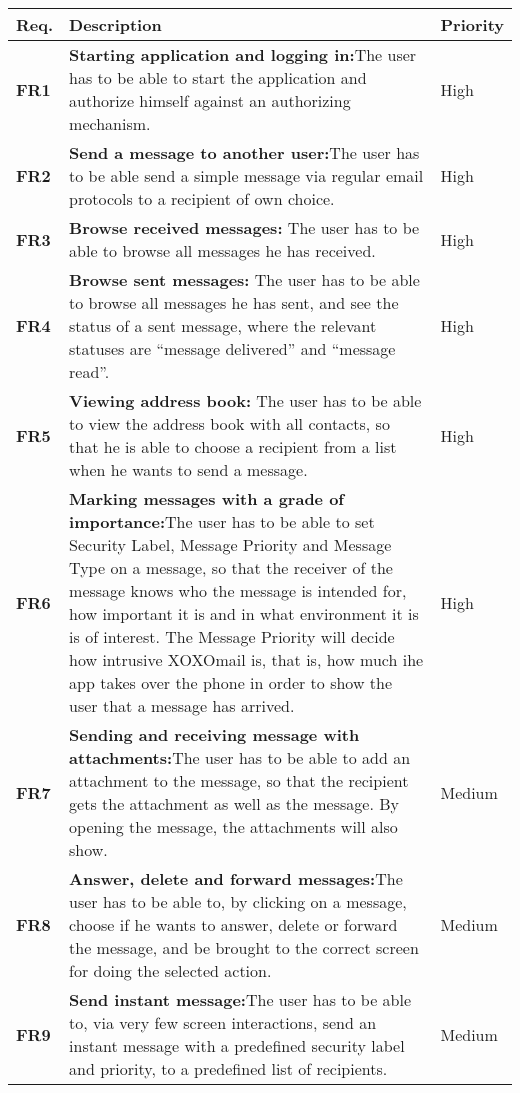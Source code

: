 \begin{table}
\begin{tabular}{p{1.5cm}|p{12.5cm}|p{2cm}}
\textbf{Req.} & \textbf{Description} & \textbf{Priority} \\ \hline \hline
\textbf{FR1} & \textbf{Starting application and logging in:}The user has to be able to start the application and authorize himself against an authorizing mechanism. & High \\ \hline
\textbf{FR2} & \textbf{Send a message to another user:}The user has to be able send a simple message via regular email protocols to a recipient of own choice. & High \\ \hline
\textbf{FR3} & \textbf{Browse received messages:} The user has to be able to browse all messages he has received. & High \\ \hline
\textbf{FR4} & \textbf{Browse sent messages:} The user has to be able to browse all messages he has sent, and see the status of a sent message, where the relevant statuses are “message delivered” and “message read”. & High \\ \hline
\textbf{FR5} & \textbf{Viewing address book:} The user has to be able to view the address book with all contacts, so that he is able to choose a recipient from a list when he wants to send a message. & High \\ \hline
\textbf{FR6} & \textbf{Marking messages with a grade of importance:}The user has to be able to set Security Label, Message Priority and Message Type on a message, so that the receiver of the message knows who the message is intended for, how important it is and in what environment it is is of interest. The Message Priority will decide how intrusive XOXOmail is, that is, how much ihe app takes over the phone in order to show the user that a message has arrived.  & High \\ \hline
\textbf{FR7} & \textbf{Sending and receiving message with attachments:}The user has to be able to add an attachment to the message, so that the recipient gets the attachment as well as the message. By opening the message, the attachments will also show. & Medium \\ \hline
\textbf{FR8} & \textbf{Answer, delete and forward messages:}The user has to be able to, by clicking on a message, choose if he wants to answer, delete or forward the message, and be brought to the correct screen for doing the selected action. & Medium \\ \hline
\textbf{FR9} & \textbf{Send instant message:}The user has to be able to, via very few screen interactions, send an instant message with a predefined security label and priority, to a predefined list of recipients. & Medium \\ \hline

\end{tabular}
\end{table}
